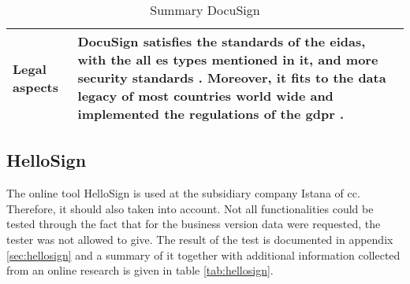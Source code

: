 \begin{table}[h!]
\begin{tabular}{|p{4cm}|p{10cm}|}
		Legal aspects & DocuSign satisfies the standards of the \gls{eidas}, with the all \gls{es} types mentioned in it, and more security standards \parencite{docusign2018certificates,docusign2018legal,docusign2018es}. Moreover, it fits to the data legacy of most countries world wide and implemented the regulations of the \gls{gdpr} \parencite{docusign2018global, docusign2018gdpr}. \\ \hline
	\end{tabular}
	\caption{Summary DocuSign}
	\label{tab:docusign}
\end{table}


\subsection{HelloSign}
The online tool HelloSign is used at the subsidiary company Istana of \gls{cc}. Therefore, it should also taken into account. Not all functionalities could be tested through the fact that for the business version data were requested, the tester was not allowed to give. The result of the test is documented in appendix \ref{sec:hellosign} and a summary of it together with additional information collected from an online research is given in table \ref{tab:hellosign}.
